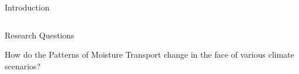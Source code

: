 \begin{frame}{Introduction}
\begin{columns}
\begin{column}{.5 \textwidth}
  \end{column}
  
\end{columns}

\end{frame}

\begin{frame}{Research Questions}
  \begin{center}
    {\huge
      How do the Patterns of Moisture Transport change in the face of various climate scenarios?
    }
    
  \end{center}  

\end{frame}
